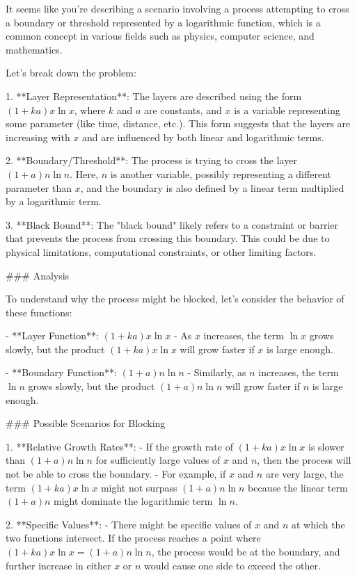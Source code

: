 It seems like you're describing a scenario involving a process attempting to cross a boundary or threshold represented by a logarithmic function, which is a common concept in various fields such as physics, computer science, and mathematics.

Let's break down the problem:

1. **Layer Representation**: The layers are described using the form \((1 + ka)x \ln x\), where \(k\) and \(a\) are constants, and \(x\) is a variable representing some parameter (like time, distance, etc.). This form suggests that the layers are increasing with \(x\) and are influenced by both linear and logarithmic terms.

2. **Boundary/Threshold**: The process is trying to cross the layer \((1 + a)n \ln n\). Here, \(n\) is another variable, possibly representing a different parameter than \(x\), and the boundary is also defined by a linear term multiplied by a logarithmic term.

3. **Black Bound**: The "black bound" likely refers to a constraint or barrier that prevents the process from crossing this boundary. This could be due to physical limitations, computational constraints, or other limiting factors.

### Analysis

To understand why the process might be blocked, let's consider the behavior of these functions:

- **Layer Function**: \((1 + ka)x \ln x\)
  - As \(x\) increases, the term \(\ln x\) grows slowly, but the product \((1 + ka)x \ln x\) will grow faster if \(x\) is large enough.
  
- **Boundary Function**: \((1 + a)n \ln n\)
  - Similarly, as \(n\) increases, the term \(\ln n\) grows slowly, but the product \((1 + a)n \ln n\) will grow faster if \(n\) is large enough.

### Possible Scenarios for Blocking

1. **Relative Growth Rates**:
   - If the growth rate of \((1 + ka)x \ln x\) is slower than \((1 + a)n \ln n\) for sufficiently large values of \(x\) and \(n\), then the process will not be able to cross the boundary.
   - For example, if \(x\) and \(n\) are very large, the term \((1 + ka)x \ln x\) might not surpass \((1 + a)n \ln n\) because the linear term \((1 + a)n\) might dominate the logarithmic term \(\ln n\).

2. **Specific Values**:
   - There might be specific values of \(x\) and \(n\) at which the two functions intersect. If the process reaches a point where \((1 + ka)x \ln x = (1 + a)n \ln n\), the process would be at the boundary, and further increase in either \(x\) or \(n\) would cause one side to exceed the other.

